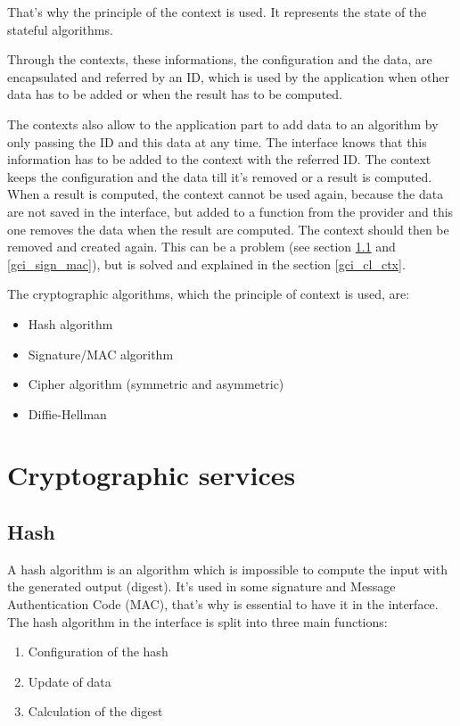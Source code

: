 That's why the principle of the context is used. It represents the
state of the stateful algorithms.

Through the contexts, these informations, the configuration and the data, are
encapsulated and referred by an ID, which is used by the application when
other data has to be added or when the result has to be computed.

The contexts also allow to the application part to add data to an
algorithm by only passing the ID and this data at any time. 
The interface knows that this information has to be added to the context
with the referred ID.
The context keeps the configuration and the data till it's removed or a result
is computed.
When a result is computed, the context cannot be used again, because
the data are not saved in the interface, but added to a function from the
provider and this one removes the data when the result are computed.
The context should then be removed and created again.
This can be a problem (see section \ref{gci_hash} and \ref{gci_sign_mac}), but is
solved and explained in the section \ref{gci_cl_ctx}.

The cryptographic algorithms, which the principle of context is used, are:
\begin{itemize}[noitemsep]
  \item Hash algorithm
  \item Signature/MAC algorithm
  \item Cipher algorithm (symmetric and asymmetric)
  \item Diffie-Hellman\newline
\end{itemize}

\section{Cryptographic services}
\subsection{Hash}
\label{gci_hash}

A hash algorithm is an algorithm which is impossible to compute the input with
the generated output (digest).
It's used in some signature and Message Authentication Code (MAC), that's why is
essential to have it in the interface.
The hash algorithm in the interface is split into three main functions:
\begin{enumerate}[noitemsep]
  \item Configuration of the hash
  \item Update of data
  \item Calculation of the digest
  
\end{enumerate}

